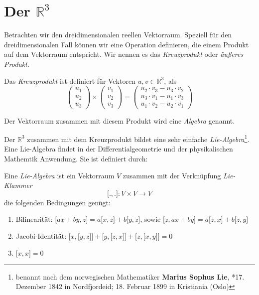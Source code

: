 \begin{TODO}

\end{TODO}

\section{Der $\mathbb{R}^3$}

Betrachten wir den dreidimensionalen reellen Vektorraum. Speziell für den dreidimensionalen Fall können wir eine Operation definieren, die einem Produkt auf dem Vektorraum entspricht. Wir nennen es das \emph{Kreuzprodukt} oder \emph{äußeres Produkt}. 

\begin{definition}
Das \emph{Kreuzprodukt} ist definiert für Vektoren $u,v\in \mathbb{R}^3$, als
\begin{equation*}
\begin{pmatrix}
u_1\\u_2\\u_3
\end{pmatrix} \times 
\begin{pmatrix}
v_1\\v_2\\v_3
\end{pmatrix}  = \begin{pmatrix}
u_2\cdot v_3-u_3\cdot v_2 \\
u_3\cdot v_1-u_1\cdot v_3 \\
u_1\cdot v_2-u_2\cdot v_1
\end{pmatrix}
\end{equation*}
\end{definition}

\begin{definition}
Der Vektorraum zusammen mit diesem Produkt wird eine \emph{Algebra} genannt.
\end{definition}

Der $\mathbb{R}^3$ zusammen mit dem Kreuzprodukt bildet eine sehr einfache \emph{Lie-Al\-ge\-bra}\footnote{benannt nach dem norwegischen Mathematiker \textbf{Marius Sophus Lie}, *17. Dezember 1842 in Nordfjordeid; 18. Februar 1899 in Kristiania (Oslo)}. Eine Lie-Algebra findet in der Differentialgeometrie und der physikalischen Mathemtik Anwendung. Sie ist definiert durch:

\begin{definition}
Eine \emph{Lie-Algebra} ist ein Vektorraum $V$ zusammen mit der Verknüpfung \emph{Lie-Klammer}
\[
\lbrack .,. \rbrack : V \times V \longrightarrow V
\]
die folgenden Bedingungen genügt:
\begin{enumerate}
\item Bilinearität: $\lbrack ax+by,z\rbrack = a\lbrack x,z\rbrack+b\lbrack y,z\rbrack$, sowie $\lbrack z, ax+by\rbrack = a\lbrack z,x\rbrack+b\lbrack z,y\rbrack$
\item Jacobi-Identität: $\lbrack x, \lbrack y,z\rbrack\rbrack + \lbrack y, \lbrack z,x\rbrack\rbrack +\lbrack z, \lbrack x,y \rbrack\rbrack = 0$
\item $\lbrack x,x \rbrack = 0$
\end{enumerate}
\end{definition}

